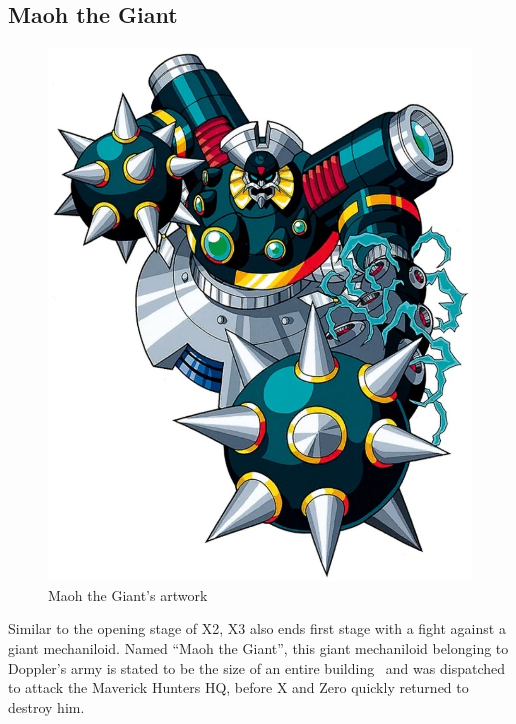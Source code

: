 \subsection{Maoh the Giant}\label{boss:Mao_the_giant}
\begin{figure}[htp]
	\centering
	\includegraphics[height=\portraitsize]{figures/X3/maohthegiant.png}
	\caption{Maoh the Giant's artwork~\cite{book:MMX_Complete_art}}
\end{figure}
Similar to the opening stage of X2, X3 also ends first stage with a fight against a giant mechaniloid. Named ``Maoh the Giant'', this giant mechaniloid belonging to Doppler's army is stated to be the size of an entire building~\cite{wayback:X3_resources} and was dispatched to attack the Maverick Hunters HQ, before X and Zero quickly returned to destroy him. 

